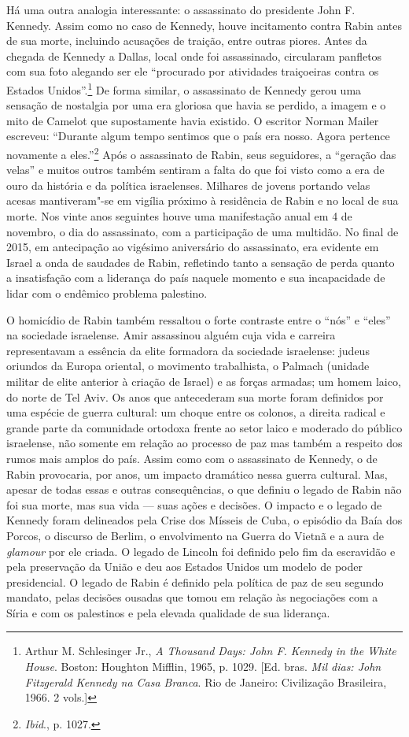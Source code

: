 Há uma outra analogia interessante: o assassinato do presidente John F.
Kennedy. Assim como no caso de Kennedy, houve incitamento contra Rabin
antes de sua morte, incluindo acusações de traição, entre outras
piores. Antes da chegada de Kennedy a Dallas, local onde foi
assassinado, circularam panfletos com sua foto alegando ser ele
``procurado por atividades traiçoeiras contra os Estados
Unidos''.\footnote{Arthur M. Schlesinger Jr., \textit{A Thousand Days: John F. Kennedy in the
White House}. Boston: Houghton Mifflin, 1965, p. 1029. {[}Ed. bras. \textit{Mil dias: John Fitzgerald Kennedy na Casa Branca}. Rio de Janeiro: Civilização Brasileira, 
1966. 2 vols.{]}} De forma similar, o assassinato de Kennedy gerou
uma sensação de nostalgia por uma era gloriosa que havia se perdido, a
imagem e o mito de Camelot que supostamente havia existido. O escritor
Norman Mailer escreveu: ``Durante algum tempo sentimos que o país era
nosso. Agora pertence novamente a eles.''\footnote{\textit{Ibid}., p. 1027.} Após o assassinato
de Rabin, seus seguidores, a ``geração das velas'' e muitos outros também
sentiram a falta do que foi visto como a era de ouro da história e da
política israelenses. Milhares de jovens portando velas acesas
mantiveram"-se em vigília próximo à residência de Rabin e no local de sua
morte. Nos vinte anos seguintes houve uma manifestação anual em 4
de novembro, o dia do assassinato, com a participação de uma multidão.
No final de 2015, em antecipação ao vigésimo aniversário do assassinato,
era evidente em Israel a onda de saudades de Rabin, refletindo tanto a
sensação de perda quanto a insatisfação com a liderança do país naquele
momento e sua incapacidade de lidar com o endêmico problema palestino.

O homicídio de Rabin também ressaltou o forte contraste entre o
``nós'' e ``eles'' na sociedade israelense. Amir assassinou alguém cuja
vida e carreira representavam a essência da elite formadora da sociedade
israelense: judeus oriundos da Europa oriental, o movimento trabalhista,
o Palmach (unidade militar de elite anterior à criação de Israel) e as
forças armadas; um homem laico, do norte de Tel Aviv. Os anos que
antecederam sua morte foram definidos por uma espécie de guerra
cultural: um choque entre os colonos, a direita radical e grande parte
da comunidade ortodoxa frente ao setor laico e moderado do público
israelense, não somente em relação ao processo de paz mas também a respeito
dos rumos mais amplos do país. Assim como com o assassinato de Kennedy,
o de Rabin provocaria, por anos, um impacto dramático nessa guerra
cultural. Mas, apesar de todas essas e outras consequências,
o que definiu o legado de Rabin não foi sua morte, mas sua vida --- suas ações e decisões. 
O impacto e o legado de Kennedy foram delineados pela Crise
dos Mísseis de Cuba, o episódio da Baía dos Porcos, o discurso de
Berlim, o envolvimento na Guerra do Vietnã e a aura de \textit{glamour}
por ele criada. O legado de Lincoln foi definido pelo fim da escravidão
e pela preservação da União e deu aos Estados Unidos um modelo de poder
presidencial. O legado de Rabin é definido pela política de paz de seu
segundo mandato, pelas decisões ousadas que tomou em relação às negociações
com a Síria e com os palestinos e pela elevada qualidade de sua liderança.

